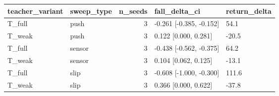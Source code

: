 \begin{tabular}{llrll}
\toprule
teacher\_variant & sweep\_type & n\_seeds & fall\_delta\_ci & return\_delta \\
\midrule
T\_full & push & 3 & -0.261 [-0.385, -0.152] & 54.1 \\
T\_weak & push & 3 & 0.122 [0.000, 0.281] & -20.5 \\
T\_full & sensor & 3 & -0.438 [-0.562, -0.375] & 64.2 \\
T\_weak & sensor & 3 & 0.104 [0.062, 0.125] & -13.1 \\
T\_full & slip & 3 & -0.608 [-1.000, -0.300] & 111.6 \\
T\_weak & slip & 3 & 0.366 [0.000, 0.622] & -37.8 \\
\bottomrule
\end{tabular}
